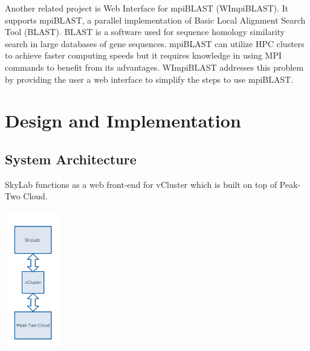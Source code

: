 Another related project is Web Interface for mpiBLAST (WImpiBLAST). It supports mpiBLAST, a parallel implementation of Basic Local Alignment Search Tool (BLAST). BLAST is a software used for sequence homology similarity search in large databases of gene sequences. mpiBLAST can utilize HPC clusters to achieve faster computing speeds but it requires knowledge in using MPI commands to benefit from its advantages. WImpiBLAST addresses this problem by providing the user a web interface to simplify the steps to use mpiBLAST\cite{9686120720140601}.   
            
        
\section{Design and Implementation}
    \subsection{System Architecture}
    SkyLab functions as a web front-end for vCluster which is built on top of Peak-Two Cloud.
    \begin{center}			
		\includegraphics[width=92px,height=224px]{./images/system_architecture.png}			
	\end{center}	
    



	


